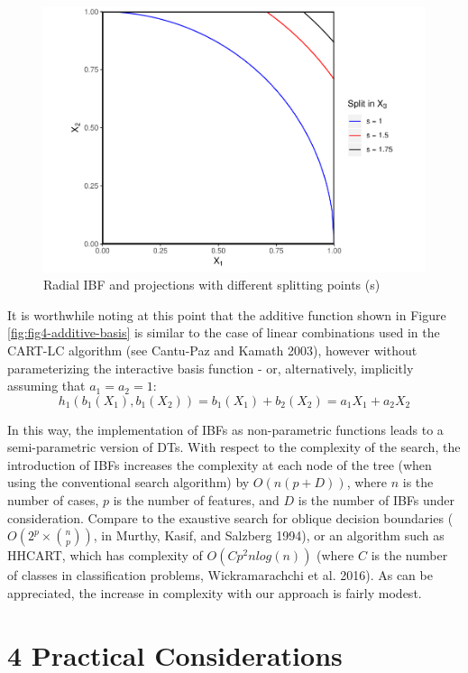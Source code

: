 \documentclass[]{elsarticle} %
\makeatletter
\def\maxwidth{\ifdim\Gin@nat@width>\linewidth\linewidth
\else\Gin@nat@width\fi}
\let\Oldincludegraphics\includegraphics
\renewcommand{\includegraphics}[1]{\Oldincludegraphics[width=\maxwidth]{#1}}
\makeatother
\begin{document}
\begin{figure}
\centering
\includegraphics{Trees_with_Base_Functions_v2_files/figure-latex/fig6-radial-basis-1.pdf}
\caption{\label{fig:fig6-radial-basis}Radial IBF and projections with
different splitting points (s)}
\end{figure}

It is worthwhile noting at this point that the additive function shown
in Figure \ref{fig:fig4-additive-basis} is similar to the case of linear
combinations used in the CART-LC algorithm (see Cantu-Paz and Kamath
2003), however without parameterizing the interactive basis function -
or, alternatively, implicitly assuming that \(a_1=a_2=1\): \[
h_1(b_1(X_1),b_1(X_2))=b_1(X_1)+b_2(X_2)=a_1X_1+a_2X_2
\]

In this way, the implementation of IBFs as non-parametric functions
leads to a semi-parametric version of DTs. With respect to the
complexity of the search, the introduction of IBFs increases the
complexity at each node of the tree (when using the conventional search
algorithm) by \(O(n(p+D))\), where \(n\) is the number of cases, \(p\)
is the number of features, and \(D\) is the number of IBFs under
consideration. Compare to the exaustive search for oblique decision
boundaries (\(O(2^p \times{n\choose{p}})\), in Murthy, Kasif, and
Salzberg 1994), or an algorithm such as HHCART, which has complexity of
\(O(Cp^2nlog(n))\) (where \(C\) is the number of classes in
classification problems, Wickramarachchi et al. 2016). As can be
appreciated, the increase in complexity with our approach is fairly
modest.

\section{4 Practical Considerations}\label{practical-considerations}
\end{document}
